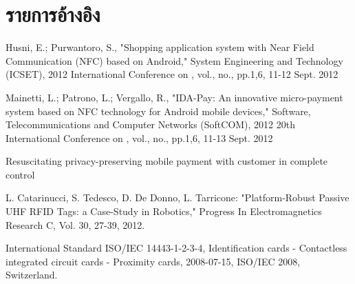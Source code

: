 \documentclass[a4paper]{article}
\begin{document}
\section{รายการอ้างอิง}
\begin{enumerate}[label={[\arabic*]}]
  	\item \label{itm:shopping} Husni, E.; Purwantoro, S., "Shopping application system with Near Field Communication (NFC) based on Android," System Engineering and Technology (ICSET), 2012 International Conference on , vol., no., pp.1,6, 11-12 Sept. 2012
  	\item \label{itm:IDA-Pay} Mainetti, L.; Patrono, L.; Vergallo, R., "IDA-Pay: An innovative micro-payment system based on NFC technology for Android mobile devices," Software, Telecommunications and Computer Networks (SoftCOM), 2012 20th International Conference on , vol., no., pp.1,6, 11-13 Sept. 2012
	\item \label{itm:rpp-mobile} Resuscitating privacy-preserving mobile payment with customer in complete control
	\item \label{itm:prp-rfid} L. Catarinucci, S. Tedesco, D. De Donno, L. Tarricone: "Platform-Robust Passive UHF RFID Tags: a Case-Study in Robotics," Progress In Electromagnetics Research C, Vol. 30, 27-39, 2012.
	\item \label{itm:cicc} International Standard ISO/IEC 14443-1-2-3-4, Identification cards - Contactless integrated circuit cards - Proximity cards, 2008-07-15, ISO/IEC 2008, Switzerland.
\end{enumerate}
\end{document}
